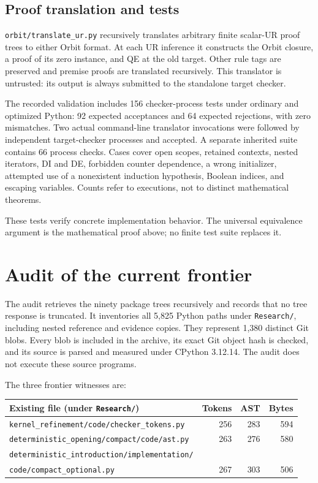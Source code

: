 \documentclass[11pt]{article}
\theoremstyle{definition}
\newcommand{\file}[1]{{\small\nolinkurl{#1}}}
\begin{document}
\subsection{Proof translation and tests}

\file{orbit/translate_ur.py} recursively translates arbitrary finite scalar-UR proof trees to either Orbit format. At each UR inference it constructs the Orbit closure, a proof of its zero instance, and QE at the old target. Other rule tags are preserved and premise proofs are translated recursively. This translator is untrusted: its output is always submitted to the standalone target checker.

The recorded validation includes 156 checker-process tests under ordinary and optimized Python: 92 expected acceptances and 64 expected rejections, with zero mismatches. Two actual command-line translator invocations were followed by independent target-checker processes and accepted. A separate inherited suite contains 66 process checks. Cases cover open scopes, retained contexts, nested iterators, DI and DE, forbidden counter dependence, a wrong initializer, attempted use of a nonexistent induction hypothesis, Boolean indices, and escaping variables. Counts refer to executions, not to distinct mathematical theorems.

These tests verify concrete implementation behavior. The universal equivalence argument is the mathematical proof above; no finite test suite replaces it.

\section{Audit of the current frontier}
\label{sec:audit}

The audit retrieves the ninety package trees recursively and records that no tree response is truncated. It inventories all 5,825 Python paths under \file{Research/}, including nested reference and evidence copies. They represent 1,380 distinct Git blobs. Every blob is included in the archive, its exact Git object hash is checked, and its source is parsed and measured under CPython 3.12.14. The audit does not execute these source programs.

The three frontier witnesses are:
\begin{center}
\small
\begin{tabular}{lrrr}
\toprule
Existing file (under \texttt{Research/}) & Tokens & AST & Bytes\\
\midrule
\texttt{kernel\_refinement/code/checker\_tokens.py} & 256 & 283 & 594\\
\texttt{deterministic\_opening/compact/code/ast.py} & 263 & 276 & 580\\
\texttt{deterministic\_introduction/implementation/} & & &\\[-2pt]
\quad\texttt{code/compact\_optional.py} & 267 & 303 & 506\\
\bottomrule
\end{tabular}
\end{center}
\end{document}
